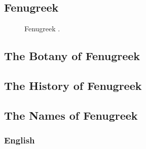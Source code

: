\subsection{Fenugreek}
\label{sec:fenugreek}



\begin{figure}[!ht]
	\vspace{-4ex}
	\centering
	\hfill
	\caption{Fenugreek \textit{}.}
	\label{fig:fenugreek_imgs}
\end{figure}

\subsection{The Botany of Fenugreek}

\subsection{The History of Fenugreek}

\subsection{The Names of Fenugreek}

\subsubsection{English}

